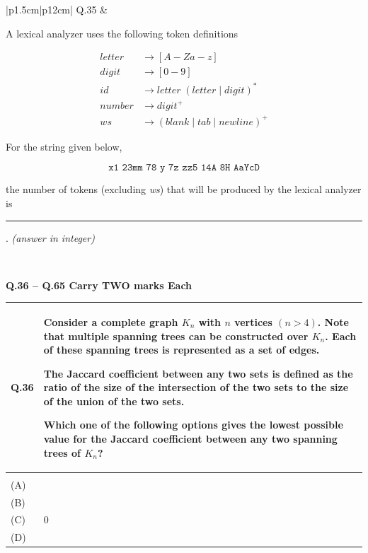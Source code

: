 \documentclass[14pt]{article}
\renewcommand{\arraystretch}{1.25}
\begin{document}
\begin{tabular}{|p{1.5cm}|p{12cm}|}
\hline
Q.35 &
\parbox[t]{\linewidth}{
A lexical analyzer uses the following token definitions

\[
\begin{aligned}
\textit{letter} &\rightarrow [A-Za-z] \\
\textit{digit} &\rightarrow [0-9] \\
\textit{id} &\rightarrow \textit{letter}\;(\textit{letter}\mid\textit{digit})^{*} \\
\textit{number} &\rightarrow \textit{digit}^{+} \\
\textit{ws} &\rightarrow (\textit{blank}\mid\textit{tab}\mid\textit{newline})^{+}
\end{aligned}
\]

For the string given below,

\[
\texttt{x1\ \ 23mm\ \ 78\ \ y\ \ 7z\ \ zz5\ \ 14A\ \ 8H\ \ AaYcD}
\]

the number of tokens (excluding \textit{ws}) that will be produced by the lexical analyzer is
\rule{2cm}{0.15mm}. \textit{(answer in integer)}
}
\\
\hline
\end{tabular}

\newpage

\textbf{Q.36 -- Q.65 Carry TWO marks Each}

\vspace{0.3cm}

\renewcommand{\arraystretch}{1.5}

\begin{tabular}{|p{1.5cm}|p{12cm}|}
\hline

Q.36 &
\parbox[t]{\linewidth}{
Consider a complete graph $K_n$ with $n$ vertices $(n>4)$. Note that
multiple spanning trees can be constructed over $K_n$. Each of these
spanning trees is represented as a set of edges.

The Jaccard coefficient between any two sets is defined as the ratio
of the size of the intersection of the two sets to the size of the union
of the two sets.

Which one of the following options gives the lowest possible value
for the Jaccard coefficient between any two spanning trees of $K_n$?

\vspace{0.25cm}
}
\\
\hline

& \\
[-0.3cm]
\hline

(A) & 
\\[0.35cm]
\hline

(B) &
\\[0.35cm]
\hline

(C) &
$0$
\\[0.25cm]
\hline

(D) &
\\[0.35cm]
\hline

\end{tabular}
\end{document}
